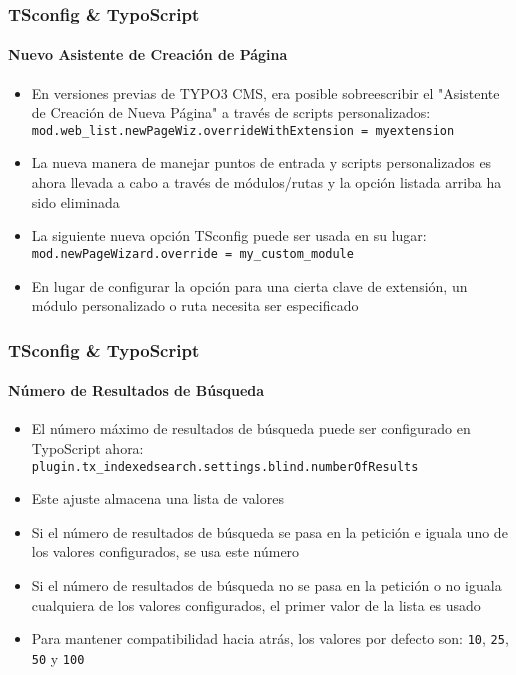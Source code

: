 \begin{frame}[fragile]
	\frametitle{TSconfig \& TypoScript}
	\framesubtitle{Nuevo Asistente de Creación de Página}

	\begin{itemize}
		\item En versiones previas de TYPO3 CMS, era posible sobreescribir el "Asistente de Creación de Nueva Página"
			a través de scripts personalizados:\newline
			\small
				\texttt{mod.web\_list.newPageWiz.overrideWithExtension = myextension}
			\normalsize
		\item La nueva manera de manejar puntos de entrada y scripts personalizados es ahora llevada a cabo a través de módulos/rutas
			y la opción listada arriba ha sido eliminada
		\item La siguiente nueva opción TSconfig puede ser usada en su lugar:
			\small
				\texttt{mod.newPageWizard.override = my\_custom\_module}
			\normalsize

		\item En lugar de configurar la opción para una cierta clave de extensión, un módulo personalizado o
			ruta necesita ser especificado

	\end{itemize}

\end{frame}
\begin{frame}[fragile]
	\frametitle{TSconfig \& TypoScript}
	\framesubtitle{Número de Resultados de Búsqueda}

	\begin{itemize}
		\item El número máximo de resultados de búsqueda puede ser configurado en TypoScript ahora:\newline
			\texttt{plugin.tx\_indexedsearch.settings.blind.numberOfResults}
		\item Este ajuste almacena una lista de valores
		\item Si el número de resultados de búsqueda se pasa en la petición e iguala uno de los valores
			configurados, se usa este número
		\item Si el número de resultados de búsqueda no se pasa en la petición o no iguala cualquiera de
			los valores configurados, el primer valor de la lista es usado
		\item Para mantener compatibilidad hacia atrás, los valores por defecto son:\newline
			\texttt{10}, \texttt{25}, \texttt{50} y \texttt{100}
	\end{itemize}

\end{frame}

